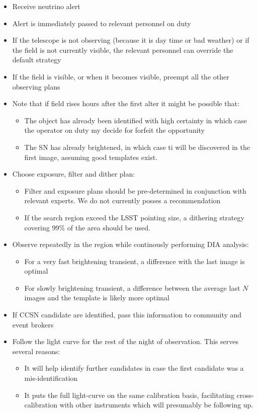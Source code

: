 \documentclass[12pt, letterpaper]{article}
\begin{document}
\begin{itemize}
\item Receive neutrino alert
\item Alert is immediately passed to relevant personnel on duty
\item If the telescope is not observing (because it is day time or bad weather) or if the field is not currently visible, the relevant personnel can override the default strategy
\item If the field is visible, or when it becomes visible, preempt all the other observing plans
\item Note that if field rises hours after the first alter it might be possible that:
\begin{itemize}
    \item The object has already been identified with high certainty in which case the operator on duty my decide for forfeit the opportunity
    \item The SN has already brightened, in which case ti will be discovered in the first image, assuming good templates exist.
\end{itemize}


\item Choose exposure, filter and dither plan:
\begin{itemize}
    \item Filter and exposure plans should be pre-determined in conjunction with relevant experts. We do not currently posses a recommendation
    \item If the search region exceed the LSST pointing size, a dithering strategy covering 99\% of the area should be used.
\end{itemize}

\item Observe repeatedly in the region while continously performing DIA analysis:
\begin{itemize}
    \item For a very fast brightening transient, a difference with the last image is optimal
    \item For slowly brightening transient, a difference between the average last $N$ images and the template is likely more optimal
\end{itemize}
\item If CCSN candidate are identified, pass this information to community and event brokers
\item Follow the light curve for the rest of the night of observation. This serves several reasons:
\begin{itemize}
    \item It will help identify further candidates in case the first candidate was a mis-identification
    \item It puts the full light-curve on the same calibration basis, facilitating cross-calibration with other instruments which will presumably be following up.
\end{itemize}
\end{itemize}
\end{document}
